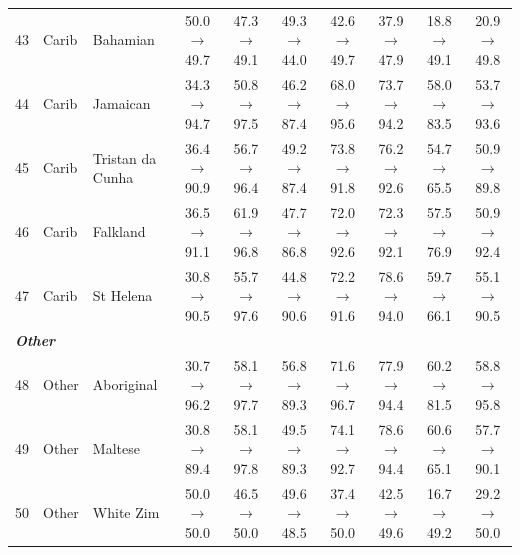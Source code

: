 \begin{table}[t]
{\begin{tabular}{rll c c c c c c c}
43 & Carib & Bahamian & 50.0$\rightarrow$49.7 & 47.3$\rightarrow$49.1 & 49.3$\rightarrow$44.0 & 42.6$\rightarrow$49.7 & 37.9$\rightarrow$47.9 & 18.8$\rightarrow$49.1 & 20.9$\rightarrow$49.8 \\
44 & Carib & Jamaican & 34.3$\rightarrow$94.7 & 50.8$\rightarrow$97.5 & 46.2$\rightarrow$87.4 & 68.0$\rightarrow$95.6 & 73.7$\rightarrow$94.2 & 58.0$\rightarrow$83.5 & 53.7$\rightarrow$93.6 \\
45 & Carib & Tristan da Cunha & 36.4$\rightarrow$90.9 & 56.7$\rightarrow$96.4 & 49.2$\rightarrow$87.4 & 73.8$\rightarrow$91.8 & 76.2$\rightarrow$92.6 & 54.7$\rightarrow$65.5 & 50.9$\rightarrow$89.8 \\
46 & Carib & Falkland & 36.5$\rightarrow$91.1 & 61.9$\rightarrow$96.8 & 47.7$\rightarrow$86.8 & 72.0$\rightarrow$92.6 & 72.3$\rightarrow$92.1 & 57.5$\rightarrow$76.9 & 50.9$\rightarrow$92.4 \\
47 & Carib & St Helena & 30.8$\rightarrow$90.5 & 55.7$\rightarrow$97.6 & 44.8$\rightarrow$90.6 & 72.2$\rightarrow$91.6 & 78.6$\rightarrow$94.0 & 59.7$\rightarrow$66.1 & 55.1$\rightarrow$90.5 \\
\midrule
\multicolumn{10}{l}{\textit{\textbf{Other}}} \\
48 & Other & Aboriginal & 30.7$\rightarrow$96.2 & 58.1$\rightarrow$97.7 & 56.8$\rightarrow$89.3 & 71.6$\rightarrow$96.7 & 77.9$\rightarrow$94.4 & 60.2$\rightarrow$81.5 & 58.8$\rightarrow$95.8 \\
49 & Other & Maltese & 30.8$\rightarrow$89.4 & 58.1$\rightarrow$97.8 & 49.5$\rightarrow$89.3 & 74.1$\rightarrow$92.7 & 78.6$\rightarrow$94.4 & 60.6$\rightarrow$65.1 & 57.7$\rightarrow$90.1 \\
50 & Other & White Zim & 50.0$\rightarrow$50.0 & 46.5$\rightarrow$50.0 & 49.6$\rightarrow$48.5 & 37.4$\rightarrow$50.0 & 42.5$\rightarrow$49.6 & 16.7$\rightarrow$49.2 & 29.2$\rightarrow$50.0 \\
\bottomrule
\end{tabular}
}
\end{table}